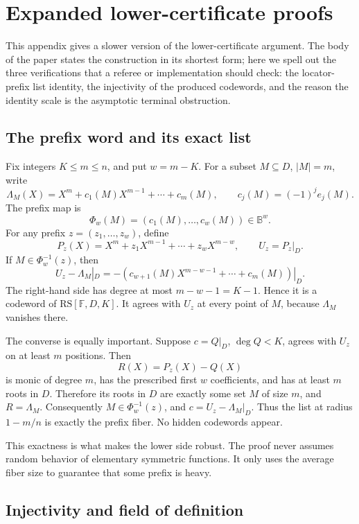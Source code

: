 \documentclass[11pt]{article}
\theoremstyle{definition}
\theoremstyle{remark}
\newcommand{\F}{\mathbb F}
\newcommand{\BB}{\mathbb B}
\newcommand{\RS}{\mathrm{RS}}
\begin{document}
\section{Expanded lower-certificate proofs}\label{app:expanded-lower}

This appendix gives a slower version of the lower-certificate argument.  The body of the paper states the construction in its shortest form; here we spell out the three verifications that a referee or implementation should check: the locator-prefix list identity, the injectivity of the produced codewords, and the reason the identity scale is the asymptotic terminal obstruction.

\subsection{The prefix word and its exact list}\label{appsub:prefix-word}

Fix integers \(K\le m\le n\), and put \(w=m-K\).  For a subset \(M\subseteq D\), \(|M|=m\), write
\[
        \Lambda_M(X)=X^m+c_1(M)X^{m-1}+\cdots+c_m(M),
        \qquad c_j(M)=(-1)^j e_j(M).
\]
The prefix map is
\[
        \Phi_w(M)=(c_1(M),\ldots,c_w(M))\in\BB^w.
\]
For any prefix \(z=(z_1,\ldots,z_w)\), define
\[
        P_z(X)=X^m+z_1X^{m-1}+\cdots+z_wX^{m-w},
        \qquad U_z=P_z|_D .
\]
If \(M\in\Phi_w^{-1}(z)\), then
\[
        U_z-\Lambda_M|_D
        =-(c_{w+1}(M)X^{m-w-1}+\cdots+c_m(M))|_D .
\]
The right-hand side has degree at most \(m-w-1=K-1\).  Hence it is a codeword of \(\RS[\F,D,K]\).  It agrees with \(U_z\) at every point of \(M\), because \(\Lambda_M\) vanishes there.

The converse is equally important.  Suppose \(c=Q|_D\), \(\deg Q<K\), agrees with \(U_z\) on at least \(m\) positions.  Then
\[
        R(X)=P_z(X)-Q(X)
\]
is monic of degree \(m\), has the prescribed first \(w\) coefficients, and has at least \(m\) roots in \(D\).  Therefore its roots in \(D\) are exactly some set \(M\) of size \(m\), and \(R=\Lambda_M\).  Consequently \(M\in\Phi_w^{-1}(z)\), and \(c=U_z-\Lambda_M|_D\).  Thus the list at radius \(1-m/n\) is exactly the prefix fiber.  No hidden codewords appear.

This exactness is what makes the lower side robust.  The proof never assumes random behavior of elementary symmetric functions.  It only uses the average fiber size to guarantee that some prefix is heavy.

\subsection{Injectivity and field of definition}\label{appsub:injectivity-field}
\end{document}
